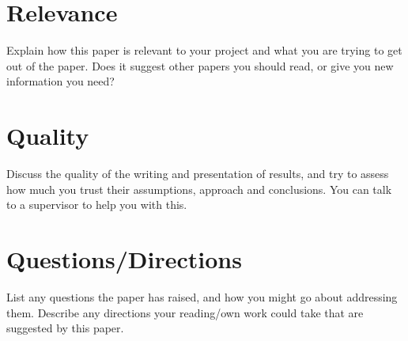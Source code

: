 \documentclass[12pt,a4paper]{article}
\begin{document}
\section*{Relevance}
Explain how this paper is relevant to your project and what you are trying to get out of the paper. Does it suggest other papers you should read, or give you new information you need?

\section*{Quality}
Discuss the quality of the writing and presentation of results, and try to assess how much you trust their assumptions, approach and conclusions. You can talk to a supervisor to help you with this.

\section*{Questions/Directions}
List any questions the paper has raised, and how you might go about addressing them. Describe any directions your reading/own work could take that are suggested by this paper.

\end{document}
